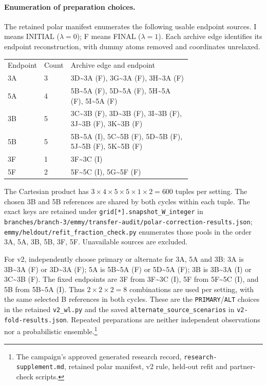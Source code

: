 \documentclass{article}
\newcommand{\rr}[1]{\footnote{The campaign's approved generated research record, \texttt{research-supplement.md}, #1.}}
\begin{document}
\paragraph{Enumeration of preparation choices.}
The retained polar manifest enumerates the following usable endpoint sources. I means INITIAL (\(\lambda=0\)); F means FINAL (\(\lambda=1\)). Each archive edge identifies its endpoint reconstruction, with dummy atoms removed and coordinates unrelaxed.
\begin{center}\begin{tabular}{llp{0.71\linewidth}}
Endpoint & Count & Archive edge and endpoint \\
3A & 3 & 3D\textasciitilde{}3A (F), 3G\textasciitilde{}3A (F), 3H\textasciitilde{}3A (F) \\
5A & 4 & 5B\textasciitilde{}5A (F), 5D\textasciitilde{}5A (F), 5H\textasciitilde{}5A (F), 5I\textasciitilde{}5A (F) \\
3B & 5 & 3C\textasciitilde{}3B (F), 3D\textasciitilde{}3B (F), 3I\textasciitilde{}3B (F), 3J\textasciitilde{}3B (F), 3K\textasciitilde{}3B (F) \\
5B & 5 & 5B\textasciitilde{}5A (I), 5C\textasciitilde{}5B (F), 5D\textasciitilde{}5B (F), 5J\textasciitilde{}5B (F), 5K\textasciitilde{}5B (F) \\
3F & 1 & 3F\textasciitilde{}3C (I) \\
5F & 2 & 5F\textasciitilde{}5C (I), 5G\textasciitilde{}5F (F) \\
\end{tabular}\end{center}
The Cartesian product has \(3\times4\times5\times5\times1\times2=600\) tuples per setting. The chosen 3B and 5B references are shared by both cycles within each tuple. The exact keys are retained under \texttt{grid[*].snapshot\_W\_integer} in \texttt{branches/branch-3/emmy/transfer-audit/polar-correction-results.json}; \texttt{emmy/heldout/refit\_fraction\_check.py} enumerates those pools in the order 3A, 5A, 3B, 5B, 3F, 5F. Unavailable sources are excluded.

For v2, independently choose primary or alternate for 3A, 5A and 3B: 3A is 3B\textasciitilde{}3A (F) or 3D\textasciitilde{}3A (F); 5A is 5B\textasciitilde{}5A (F) or 5D\textasciitilde{}5A (F); 3B is 3B\textasciitilde{}3A (I) or 3C\textasciitilde{}3B (F). The fixed endpoints are 3F from 3F\textasciitilde{}3C (I), 5F from 5F\textasciitilde{}5C (I), and 5B from 5B\textasciitilde{}5A (I). Thus \(2\times2\times2=8\) combinations are used per setting, with the same selected B references in both cycles. These are the \texttt{PRIMARY}/\texttt{ALT} choices in the retained \texttt{v2\_wl.py} and the saved \texttt{alternate\_source\_scenarios} in \texttt{v2-fold-results.json}. Repeated preparations are neither independent observations nor a probabilistic ensemble.\rr{retained polar manifest, v2 rule, held-out refit and partner-check scripts}
\end{document}
